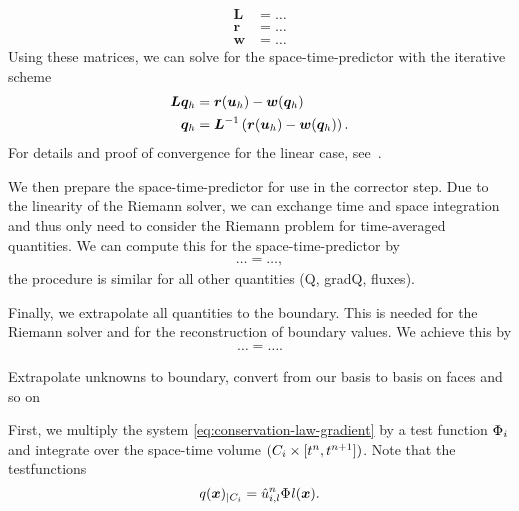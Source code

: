\newcommand{\pleft}{\bm{L}}
\newcommand{\prightsol}{\bm{r}}
\newcommand{\prightpred}{\bm{w}}
\begin{align}
  \label{eq:predictor-matrices}
  \pleft &= \ldots \\
  \prightsol &= \ldots \\
  \prightpred &= \ldots
\end{align}
Using these matrices, we can solve for the space-time-predictor with the iterative scheme
\begin{align}
  \label{eq:predictor-iterative}
  \pleft \stpredictor &= \prightsol (\dsol) - \prightpred(\stpredictor) \\
 \stpredictor &= \pleft^{-1} \left( \prightsol (\dsol) - \prightpred(\stpredictor) \right).
\end{align}
For details and proof of convergence for the linear case, see~\cite{dumbser2008unified}.

We then prepare the space-time-predictor for use in the corrector step.
Due to the linearity of the Riemann solver, we can exchange time and space integration and thus only need to consider the Riemann problem for time-averaged quantities.
We can compute this for the space-time-predictor by
\begin{align}
  \ldots = \ldots,
\end{align}
the procedure is similar for all other quantities (Q, gradQ, fluxes).

Finally, we extrapolate all quantities to the boundary.
This is needed for the Riemann solver and for the reconstruction of boundary values.
We achieve this by
\begin{align}
  \label{eq:boundary-extrapolation}
  \ldots = \ldots.
\end{align}

Extrapolate unknowns to boundary, convert from our basis to basis on faces and so on

First, we multiply the system \cref{eq:conservation-law-gradient} by a test function $\Phi_{i}$ and integrate over the space-time volume $(C_{i} \times [t^n, t^{n+1}])$.
Note that the testfunctions
\begin{equation}
  \label{eq:cell-approx-space}
  q(\bm{x})_{|\cell[i]} = \hat{u}^n_{i,l} \sbasis{l}(\bm{x}).
\end{equation}

